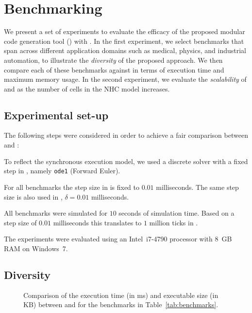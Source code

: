 \section{Benchmarking}
\label{sec:benchmarking}


We present a set of experiments to evaluate the efficacy of the proposed modular code generation tool (\ourTool) with \simulink. 
In the first experiment, we select benchmarks that span across different application domains such as medical, physics, and industrial automation, to illustrate the \emph{diversity} of the proposed approach.
We then compare each of these benchmarks against \simulink in terms of execution time and maximum memory usage.
In the second experiment, we evaluate the \emph{scalability} of \ourTool and \simulink as the number of cells in the \ac{NHC} model increases. 


\subsection{Experimental set-up}
\label{sec:experimentalSetUp}
The following steps were considered in order to achieve a fair comparison between \ourTool and \simulink:

\begin{description}
	\item[\textbf{Solver}] To reflect the synchronous execution model, we used a discrete solver with a fixed step in \simulink, namely \texttt{ode1} (Forward Euler).
	
	\item[\textbf{Step Size}] For all benchmarks the step size in \simulink is fixed to $0.01$ milliseconds.
	The same step size is also used in \ourTool, $\delta = 0.01$ milliseconds.
	
	\item[\textbf{Time}] All benchmarks were simulated for $10$ seconds of simulation time.
	Based on a step size of $0.01$ milliseconds this translates to $1$ million ticks in \ourTool.
\end{description}

The experiments were evaluated using an Intel~i7-4790 processor with 8~GB RAM on Windows~7. 


\subsection{Diversity}

\begin{figure}[htbp]
	\centering
	\caption{Comparison of the execution time (in ms) and executable size (in KB) between \simulink and \ourTool for the benchmarks in Table~\ref{tab:benchmarks}.}
	\label{fig:results}
\end{figure}

